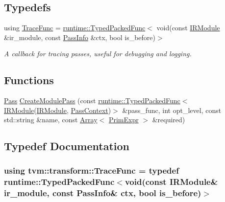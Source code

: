\subsection*{Typedefs}
\begin{DoxyCompactItemize}
\item 
using \hyperlink{namespacetvm_1_1transform_a0904052a95bd90a669cba07770694652}{Trace\+Func} = \hyperlink{classtvm_1_1runtime_1_1TypedPackedFunc}{runtime\+::\+Typed\+Packed\+Func}$<$ void(const \hyperlink{classtvm_1_1IRModule}{I\+R\+Module} \&ir\+\_\+module, const \hyperlink{classtvm_1_1transform_1_1PassInfo}{Pass\+Info} \&ctx, bool is\+\_\+before)$>$
\begin{DoxyCompactList}\small\item\em A callback for tracing passes, useful for debugging and logging. \end{DoxyCompactList}\end{DoxyCompactItemize}
\subsection*{Functions}
\begin{DoxyCompactItemize}
\item 
\hyperlink{classtvm_1_1transform_1_1Pass}{Pass} \hyperlink{namespacetvm_1_1transform_a6b8fcf03bde56b5b0ad51ad9a0f5fd36}{Create\+Module\+Pass} (const \hyperlink{classtvm_1_1runtime_1_1TypedPackedFunc}{runtime\+::\+Typed\+Packed\+Func}$<$ \hyperlink{classtvm_1_1IRModule}{I\+R\+Module}(\hyperlink{classtvm_1_1IRModule}{I\+R\+Module}, \hyperlink{classtvm_1_1transform_1_1PassContext}{Pass\+Context})$>$ \&pass\+\_\+func, int opt\+\_\+level, const std\+::string \&name, const \hyperlink{classtvm_1_1Array}{Array}$<$ \hyperlink{classtvm_1_1PrimExpr}{Prim\+Expr} $>$ \&required)
\end{DoxyCompactItemize}


\subsection{Typedef Documentation}
\subsubsection[{\texorpdfstring{Trace\+Func}{TraceFunc}}]{\setlength{\rightskip}{0pt plus 5cm}using {\bf tvm\+::transform\+::\+Trace\+Func} = typedef {\bf runtime\+::\+Typed\+Packed\+Func}$<$void(const {\bf I\+R\+Module}\& ir\+\_\+module, const {\bf Pass\+Info}\& ctx, bool is\+\_\+before)$>$}\hypertarget{namespacetvm_1_1transform_a0904052a95bd90a669cba07770694652}{}\label{namespacetvm_1_1transform_a0904052a95bd90a669cba07770694652}


